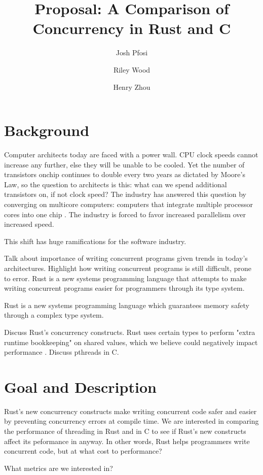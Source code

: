 \documentclass{article}
\title{Proposal: A Comparison of Concurrency in Rust and C}
\author{
    Josh Pfosi\\
    \and
    Riley Wood\\
    \and
    Henry Zhou\\
}
\begin{document}
\maketitle


\section*{Background}
Computer architects today are faced with a power wall. CPU clock speeds cannot increase any further, else they will be unable to be cooled. Yet the number of transistors onchip continues to double every two years as dictated by Moore's Law, so the question to architects is this: what can we spend additional transistors on, if not clock speed? The industry has answered this question by converging on multicore computers: computers that integrate multiple processor cores into
one chip \cite{Larus:2009}. The industry is forced to favor increased parallelism over increased speed.

This shift has huge ramifications for the software industry.

Talk about importance of writing concurrent programs given trends in today's architectures. Highlight how writing concurrent programs is still difficult, prone to error. Rust is a new systems programming language that attempts to make writing concurrent programs easier for programmers through its type system. 

Rust is a new systems programming language which guarantees memory safety through a complex type system. 

Discuss Rust's concurrency constructs. Rust uses certain types to perform "extra runtime bookkeeping" on shared values, which we believe could negatively impact performance \cite{rust-lang.org}. Discuss pthreads in C.

\section*{Goal and Description}
Rust's new concurrency constructs make writing concurrent code safer and easier by preventing concurrency errors at compile time. We are interested in comparing the performance of threading in Rust and in C to see if Rust's new constructs affect its peformance in anyway. In other words, Rust helps programmers write concurrent code, but at what cost to performance?

What metrics are we interested in?
\end{document}

